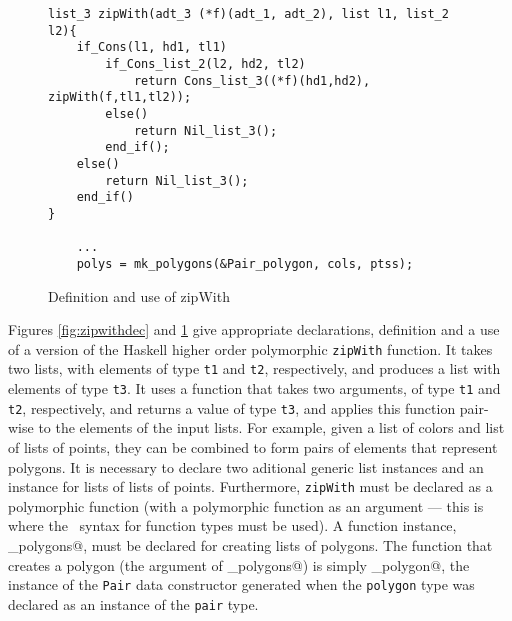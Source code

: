 \begin{figure}[!ht]
\begin{verbatim}
list_3 zipWith(adt_3 (*f)(adt_1, adt_2), list l1, list_2 l2){
    if_Cons(l1, hd1, tl1)
        if_Cons_list_2(l2, hd2, tl2)
            return Cons_list_3((*f)(hd1,hd2), zipWith(f,tl1,tl2));
        else()
            return Nil_list_3();
        end_if();
    else()
        return Nil_list_3();
    end_if()
}

    ...
    polys = mk_polygons(&Pair_polygon, cols, ptss);
\end{verbatim}
\caption{Definition and use of zipWith}
\label{fig:zipwithdef}
\end{figure}

Figures \ref{fig:zipwithdec} and \ref{fig:zipwithdef} give appropriate
declarations, definition and a use of a version of the Haskell higher
order polymorphic \texttt{zipWith} function.  It takes two lists,
with elements of type \texttt{t1} and \texttt{t2}, respectively, and
produces a list with elements of type \texttt{t3}. It uses a function
that takes two arguments, of type \texttt{t1} and \texttt{t2},
respectively, and returns a value of type \texttt{t3},
and applies this function pair-wise to the elements of the input lists.
For example, given a list of colors and list of lists of points, they
can be combined to form pairs of elements that represent polygons.
It is necessary to declare two aditional generic list instances and an
instance for lists of lists of points.  Furthermore, \texttt{zipWith}
must be declared as a polymorphic function (with a polymorphic function
as an argument --- this is where the \adtpp\ syntax for function types
must be used).  A function instance, \verb@mk_polygons@, must
be declared for creating lists of polygons.  The function that creates
a polygon (the argument of \verb@mk_polygons@) is simply
\verb@Pair_polygon@, the instance of
the \texttt{Pair} data constructor generated when the \texttt{polygon}
type was declared as an instance of the \texttt{pair} type.


